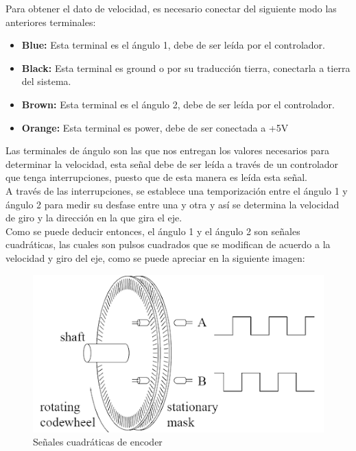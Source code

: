\documentclass[12pt,titlepage]{article}
\begin{document}
Para obtener el dato de velocidad, es necesario conectar del siguiente modo las anteriores terminales: 
\begin{itemize}
\item \textbf{Blue:} Esta terminal es el ángulo 1, debe de ser leída por el controlador. 
\item \textbf{Black:} Esta terminal es ground o por su traducción tierra, conectarla a tierra  del sistema. 
\item \textbf{Brown:} Esta terminal es el ángulo 2, debe de ser leída por el controlador. 
\item \textbf{Orange:} Esta terminal es power, debe de ser conectada a +5V 
\end{itemize}

Las terminales de ángulo son las que nos entregan los valores necesarios para determinar la velocidad, esta señal debe de ser leída a través de un controlador que tenga interrupciones, puesto que de esta manera es leída esta señal.\\

A través de las interrupciones, se establece una temporización entre el ángulo 1 y ángulo 2  para medir su desfase entre una y otra y así se determina la velocidad de giro y la dirección en la que gira el eje. \\ 

Como se puede deducir entonces, el ángulo 1 y el ángulo 2 son señales cuadráticas, las cuales son pulsos cuadrados que se modifican de acuerdo a la velocidad y giro del eje, como se puede apreciar en la siguiente imagen:  

\begin{figure}[htbp]
\hspace*{4.5cm} 
\includegraphics[scale=0.40]{signals_encoder}
\caption{Señales cuadráticas de encoder}
\end{figure}
\newpage
\end{document}
